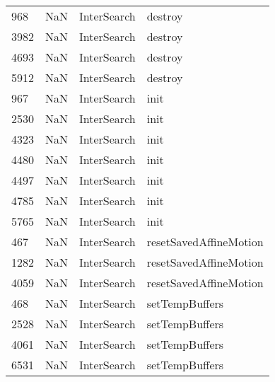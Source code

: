 \begin{tabular}{llll}
968  &                   NaN &                InterSearch &                                   destroy \\
3982 &                   NaN &                InterSearch &                                   destroy \\
4693 &                   NaN &                InterSearch &                                   destroy \\
5912 &                   NaN &                InterSearch &                                   destroy \\
967  &                   NaN &                InterSearch &                                      init \\
2530 &                   NaN &                InterSearch &                                      init \\
4323 &                   NaN &                InterSearch &                                      init \\
4480 &                   NaN &                InterSearch &                                      init \\
4497 &                   NaN &                InterSearch &                                      init \\
4785 &                   NaN &                InterSearch &                                      init \\
5765 &                   NaN &                InterSearch &                                      init \\
467  &                   NaN &                InterSearch &                    resetSavedAffineMotion \\
1282 &                   NaN &                InterSearch &                    resetSavedAffineMotion \\
4059 &                   NaN &                InterSearch &                    resetSavedAffineMotion \\
468  &                   NaN &                InterSearch &                            setTempBuffers \\
2528 &                   NaN &                InterSearch &                            setTempBuffers \\
4061 &                   NaN &                InterSearch &                            setTempBuffers \\
6531 &                   NaN &                InterSearch &                            setTempBuffers \\

\end{tabular}
